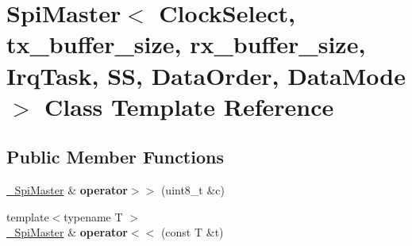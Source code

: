 \hypertarget{classSpiMaster}{}\section{Spi\+Master$<$ Clock\+Select, tx\+\_\+buffer\+\_\+size, rx\+\_\+buffer\+\_\+size, Irq\+Task, SS, Data\+Order, Data\+Mode $>$ Class Template Reference}
\label{classSpiMaster}
\subsection*{Public Member Functions}
\begin{DoxyCompactItemize}
\item 
\hypertarget{classSpiMaster_a2a50e37ac4a9f972265621a8fac114be}{}\label{classSpiMaster_a2a50e37ac4a9f972265621a8fac114be} 
\hyperlink{classSpiMaster}{\+\_\+\+Spi\+Master} \& {\bfseries operator$>$$>$} (uint8\+\_\+t \&c)
\item 
\hypertarget{classSpiMaster_a14f96a6b4507097f6ae6f2a6cb118740}{}\label{classSpiMaster_a14f96a6b4507097f6ae6f2a6cb118740} 
{\footnotesize template$<$typename T $>$ }\\\hyperlink{classSpiMaster}{\+\_\+\+Spi\+Master} \& {\bfseries operator$<$$<$} (const T \&t)
\end{DoxyCompactItemize}
